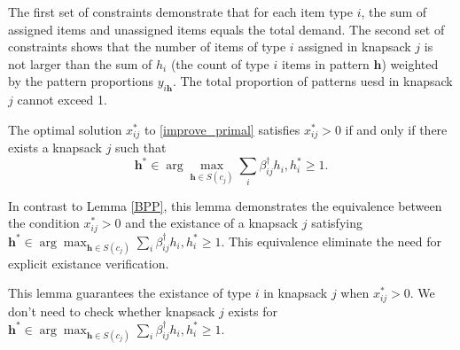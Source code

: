 The first set of constraints demonstrate that for each item type $i$, the sum of assigned items and unassigned items equals the total demand. The second set of constraints shows that the number of items of type $i$ assigned in knapsack $j$ is not larger than the sum of $h_{i}$ (the count of type $i$ items in pattern $\bm{h}$) weighted by the pattern proportions $y_{i \bm{h}}$. The total proportion of patterns uesd in knapsack $j$ cannot exceed 1.

\begin{lem}
The optimal solution $x_{ij}^{*}$ to \eqref{improve_primal} satisfies $x_{ij}^{*} > 0$ if and only if there exists a knapsack $j$ such that $$\bm{h}^{*} \in \arg\max_{\bm{h} \in S(c_j)} \sum_{i} \beta_{ij}^{\dag} h_{i}, h_{i}^{*} \geq 1.$$
\end{lem}

In contrast to Lemma \ref{BPP}, this lemma demonstrates the equivalence between the condition $x_{ij}^{*} > 0$ and the existance of a knapsack $j$ satisfying $\bm{h}^{*} \in \arg\max_{\bm{h} \in S(c_j)} \sum_{i} \beta_{ij}^{\dag} h_{i}, h_{i}^{*} \geq 1$. This equivalence eliminate the need for explicit existance verification.

This lemma guarantees the existance of type $i$ in knapsack $j$ when $x_{ij}^{*} > 0$. We don't need to check whether knapsack $j$ exists for $\bm{h}^{*} \in \arg\max_{\bm{h} \in S(c_j)} \sum_{i} \beta_{ij}^{\dag} h_{i}, h_{i}^{*} \geq 1$.

